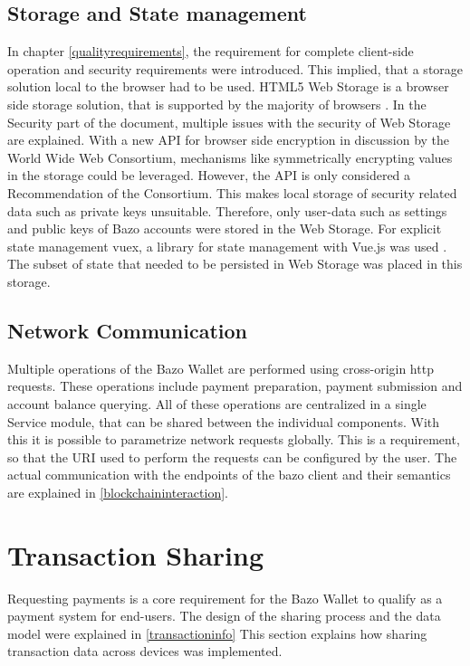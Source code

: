 \subsection{Storage and State management\label{storageandstate}}
In chapter \ref{qualityrequirements}, the requirement for complete client-side operation and security requirements were introduced. This implied, that a storage solution local to the browser had to be used. HTML5 Web Storage is a browser side storage solution, that is supported by the majority of browsers \cite{localstoragetest} \cite{localstorage}.
In the Security part of the document, multiple issues with the security of Web Storage are explained\cite{localstorage}.
With a new API for browser side encryption in discussion by the World Wide Web Consortium, mechanisms like symmetrically encrypting values in the storage could be leveraged. However, the API is only considered a Recommendation of the Consortium\cite{webcrypto}.
This makes local storage of security related data such as private keys unsuitable. Therefore, only user-data such as settings and public keys of Bazo accounts were stored in the Web Storage. For explicit state management vuex, a library for state management with Vue.js was used \cite{vuex}. The subset of state that needed to be persisted in Web Storage was placed in this storage.
\subsection{Network Communication}
Multiple operations of the Bazo Wallet are performed using cross-origin http requests. These operations include payment preparation, payment submission and account balance querying. All of these operations are centralized in a single Service module, that can be shared between the individual components. With this it is possible to parametrize network requests globally. This is a requirement, so that the URI used to perform the requests can be configured by the user. The actual communication with the endpoints of the bazo client and their semantics are explained in \ref{blockchaininteraction}.

\section{Transaction Sharing}
Requesting payments is a core requirement for the Bazo Wallet to qualify as a payment system for end-users. The design of the sharing process and the data model were explained in \ref{transactioninfo} This section explains how sharing transaction data across devices was implemented.
